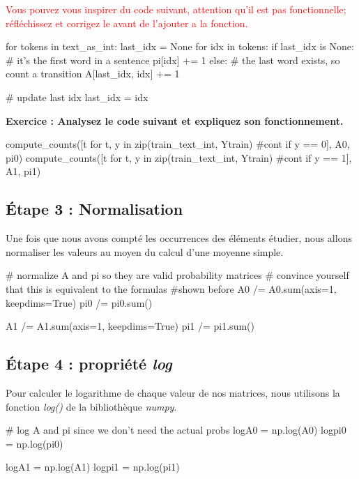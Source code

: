 \textcolor{red}{Vous pouvez vous inspirer du code suivant, attention qu'il est pas fonctionnelle; réfléchissez et corrigez le avant de l'ajouter a la fonction.}

\begin{python}
for tokens in text_as_int:
last_idx = None
for idx in tokens:
if last_idx is None:
# it's the first word in a sentence
pi[idx] += 1
else:
# the last word exists, so count a transition
A[last_idx, idx] += 1

# update last idx
last_idx = idx
\end{python}

\textbf{Exercice :
Analysez le code suivant et expliquez son fonctionnement.}
\begin{python}
compute_counts([t for t, y in zip(train_text_int, Ytrain) #cont
 if y == 0], A0, pi0)
compute_counts([t for t, y in zip(train_text_int, Ytrain) #cont
 if y == 1], A1, pi1)
\end{python}
\vspace{5cm}


\subsection{Étape 3 : Normalisation}
Une fois que nous avons compté les occurrences des éléments étudier, nous allons normaliser les valeurs au moyen du calcul d'une moyenne simple.

\begin{python}
# normalize A and pi so they are valid probability matrices
# convince yourself that this is equivalent to the formulas 
#shown before
A0 /= A0.sum(axis=1, keepdims=True)
pi0 /= pi0.sum()

A1 /= A1.sum(axis=1, keepdims=True)
pi1 /= pi1.sum()
\end{python}

\subsection{Étape 4 : propriété \textit{log}}

Pour calculer le logarithme de chaque valeur de nos matrices, nous utilisons la fonction \textit{log()} de la bibliothèque \textit{numpy}.
\begin{python}
# log A and pi since we don't need the actual probs
logA0 = np.log(A0)
logpi0 = np.log(pi0)

logA1 = np.log(A1)
logpi1 = np.log(pi1)
\end{python}

